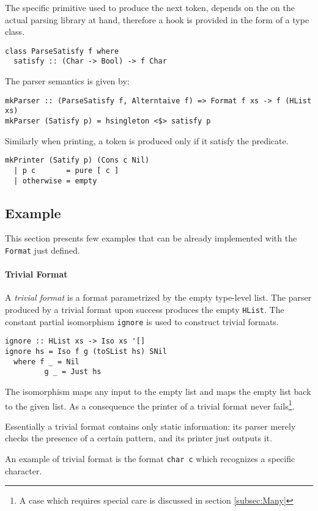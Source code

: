 \documentclass[../Thesis.tex]{subfiles}
\begin{document}
The specific primitive used to produce the next token, depends on the on the actual parsing library at hand, therefore a hook is provided in the form of a type class.

\begin{verbatim}
class ParseSatisfy f where
  satisfy :: (Char -> Bool) -> f Char
\end{verbatim}

The parser semantics is given by:
\begin{verbatim}
mkParser :: (ParseSatisfy f, Alterntaive f) => Format f xs -> f (HList xs)
mkParser (Satisfy p) = hsingleton <$> satisfy p
\end{verbatim} 

Similarly when printing, a token is produced only if it satisfy the predicate.
\begin{verbatim}
mkPrinter (Satify p) (Cons c Nil) 
  | p c       = pure [ c ]
  | otherwise = empty
\end{verbatim}

\subsection{Example}
This section presents few examples that can be already implemented with the \texttt{Format} just defined.

\paragraph{Trivial Format}
A \emph{trivial format }is a format parametrized by the empty type-level list.
The parser produced by a trivial format upon success produces the empty \texttt{HList}. The constant partial isomorphism \texttt{ignore} is used to construct trivial formats.

\begin{verbatim}
ignore :: HList xs -> Iso xs '[]
ignore hs = Iso f g (toSList hs) SNil
  where f _ = Nil
         g _ = Just hs
\end{verbatim}
The isomorphism maps any input to the empty list and maps the empty list back to the given list. As a consequence the printer of a trivial format never fails\footnote{A case which requires special care is discussed in section \ref{subsec:Many}}.

Essentially a trivial format contains only static information: its
parser merely checks the presence of a certain pattern, and its printer
just outputs it.

An example of trivial format is the format \texttt{char c} which recognizes a specific character.
\end{document}

